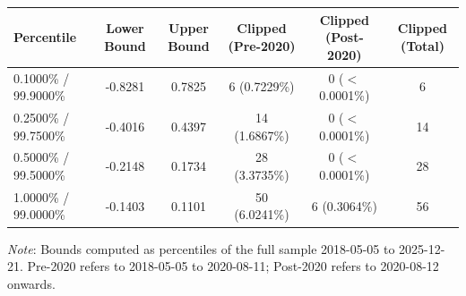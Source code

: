 \begin{tabular}{lccccc}
  \toprule
  \textbf{Percentile} & \textbf{Lower Bound} & \textbf{Upper Bound} & \textbf{Clipped (Pre-2020)} & \textbf{Clipped (Post-2020)} & \textbf{Clipped (Total)} \\ 
  \midrule
  0.1000\% / 99.9000\% & -0.8281 & 0.7825 & 6 (0.7229\%) & 0 ($<$0.0001\%) & 6 \\ 
  0.2500\% / 99.7500\% & -0.4016 & 0.4397 & 14 (1.6867\%) & 0 ($<$0.0001\%) & 14 \\ 
  0.5000\% / 99.5000\% & -0.2148 & 0.1734 & 28 (3.3735\%) & 0 ($<$0.0001\%) & 28 \\ 
  1.0000\% / 99.0000\% & -0.1403 & 0.1101 & 50 (6.0241\%) & 6 (0.3064\%) & 56 \\ 
  \bottomrule
\end{tabular}
\par\vspace{4pt}
\begin{minipage}{\linewidth}
  \footnotesize \textit{Note}: Bounds computed as percentiles of the full sample 2018-05-05 to 2025-12-21. Pre-2020 refers to 2018-05-05 to 2020-08-11; Post-2020 refers to 2020-08-12 onwards.
\end{minipage}